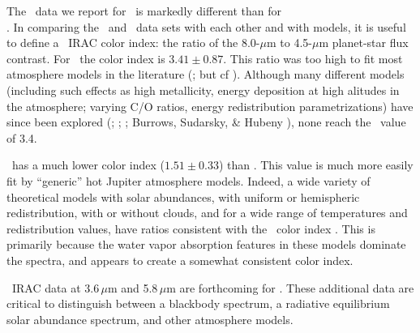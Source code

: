 The \spi\ data we report for \tresTwo\ is markedly different than for \tresOne\ \\ \citep{Charbonneau_Allen_Megeath:apj:2005a}. 
In comparing the \tresTwo\ and \tresOne\ data sets with each other and with models, it is useful to define a \spi\ IRAC color index: the ratio of the 8.0-$\mu$m to 4.5-$\mu$m planet-star flux contrast.
For \tresOne\ the color index is \mbox{$3.41 \pm 0.87$}.
This ratio was too high to fit most atmosphere models in the literature (\citealp[see][]{Fortney_Marley_Lodders:apjl:2005a, Seager_Richardson_Hansen:apj:2005a, Barman_Hauschildt_Allard:apj:2005a};  but cf \citealt*{Burrows_Sudarsky_Hubeny:apj:2006a}).
Although many different models (including such effects as high metallicity, energy deposition at high alitudes in the atmosphere; varying C/O ratios, energy redistribution parametrizations) have since been explored (\citealp{Barman_Hauschildt_Allard:apj:2005a}; \citealp{Fortney_Marley_Lodders:apjl:2005a}; \citealp{Seager_Richardson_Hansen:apj:2005a};  Burrows, Sudarsky, \& Hubeny \citeyear{Burrows_Sudarsky_Hubeny:apj:2006a}), none reach the \tresOne\ value of 3.4.

\tresTwo\ has a much lower color index (\mbox{$1.51 \pm 0.33$}) than \tresOne.
This value is much more easily fit by ``generic'' hot Jupiter atmosphere models. 
Indeed, a wide variety of theoretical models with solar abundances, with uniform or hemispheric redistribution, with or without clouds, and for a wide range of temperatures and redistribution values, have ratios consistent with the \tresTwo\ color index \citep[see, e.g.,][]{Fortney_Marley_Lodders:apjl:2005a, Barman_Hauschildt_Allard:apj:2005a, Charbonneau_Allen_Megeath:apj:2005a}.
This is primarily because the water vapor absorption features in these models dominate the spectra, and appears to create a somewhat consistent color index.

\spi\ IRAC data at 3.6\,$\mu$m and 5.8\,$\mu$m are forthcoming for \tresTwo.
These additional data are critical to distinguish between a blackbody spectrum, a radiative equilibrium solar abundance spectrum, and other atmosphere models.

